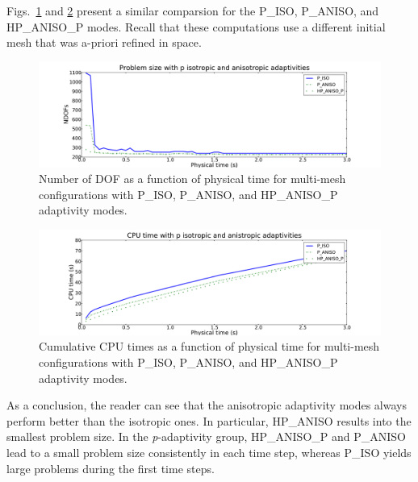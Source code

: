 \noindent
Figs.~\ref{fig:isoanisopdof} and \ref{fig:isoanisopcpu} present a similar 
comparsion for the P\_ISO, P\_ANISO, and HP\_ANISO\_P modes. Recall that these 
computations use a different initial mesh that was a-priori refined in space.


\begin{figure}[!ht]
  \begin{centering}
  \includegraphics[width=\columnwidth]{isoanisop_dof}
  \caption{\label{fig:isoanisopdof} Number of DOF as a function of physical time
  for multi-mesh configurations with P\_ISO, P\_ANISO, and
  HP\_ANISO\_P adaptivity modes.}
  \end{centering}
\end{figure}

\begin{figure}[!ht]
  \begin{centering}
  \includegraphics[width=\columnwidth]{isoanisop_cpu}
  \caption{\label{fig:isoanisopcpu} Cumulative CPU times as a function of physical time
  for multi-mesh configurations with P\_ISO, P\_ANISO, and
  HP\_ANISO\_P adaptivity modes.}
  \end{centering}
\end{figure}

As a conclusion, the reader can see that the anisotropic adaptivity modes always perform better than 
the isotropic ones. In particular, HP\_ANISO results into the smallest problem size. 
In the \emph{p}-adaptivity group, HP\_ANISO\_P and P\_ANISO lead to a small problem size
consistently in each time step, whereas P\_ISO yields large problems
during the first time steps. 

